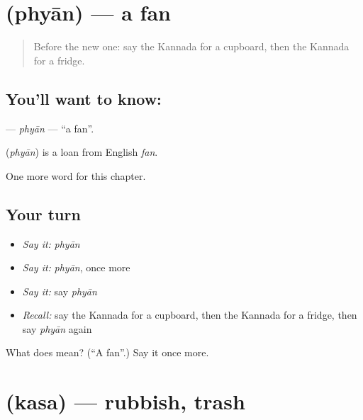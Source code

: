 \section[\texorpdfstring{\kn{ಫ್ಯಾನ್} (phyān)}{ಫ್ಯಾನ್ (phyān)}]{ (phyān) — a fan}

\label{lesson:KA-C220-phyan}



\begin{quote}
Before the new one: say the Kannada for a cupboard, then the Kannada for a fridge.
\end{quote}

\subsection*{You'll want to know: }
\textbf{} — \emph{phyān} — \textquotedblleft{}a fan\textquotedblright{}.

\begin{cousinweb}
\textbf{} (\emph{phyān}) is a loan from English \emph{fan}.
\end{cousinweb}

\begin{grammarlens}[title={What you've built}]
One more word for this chapter.
\end{grammarlens}

\subsection*{Your turn}
\begin{itemize}
\raggedright
  \item \emph{Say it:} \emph{phyān}
  \item \emph{Say it:} \emph{phyān}, once more
  \item \emph{Say it:} say \emph{phyān}
  \item \emph{Recall:} say the Kannada for a cupboard, then the Kannada for a fridge, then say \emph{phyān} again
\end{itemize}

\begin{tcolorbox}[breakable,colback=teal!4,colframe=teal!35!black,title={Before you move on}]
What does  mean? (\textquotedblleft{}A fan\textquotedblright{}.) Say it once more.
\end{tcolorbox}
\section[\texorpdfstring{\kn{ಕಸ} (kasa)}{ಕಸ (kasa)}]{ (kasa) — rubbish, trash}

